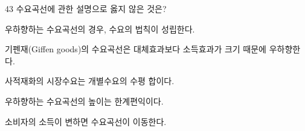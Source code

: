 \begin{question}{43}
수요곡선에 관한 설명으로 옳지 않은 것은?
\begin{choices}
  \item 우하향하는 수요곡선의 경우, 수요의 법칙이 성립한다.
  \item 기펜재(Giffen goods)의 수요곡선은 대체효과보다 소득효과가 크기 때문에 우하향한다.
  \item 사적재화의 시장수요는 개별수요의 수평 합이다.
  \item 우하향하는 수요곡선의 높이는 한계편익이다.
  \item 소비자의 소득이 변하면 수요곡선이 이동한다.
\end{choices}
\end{question}
